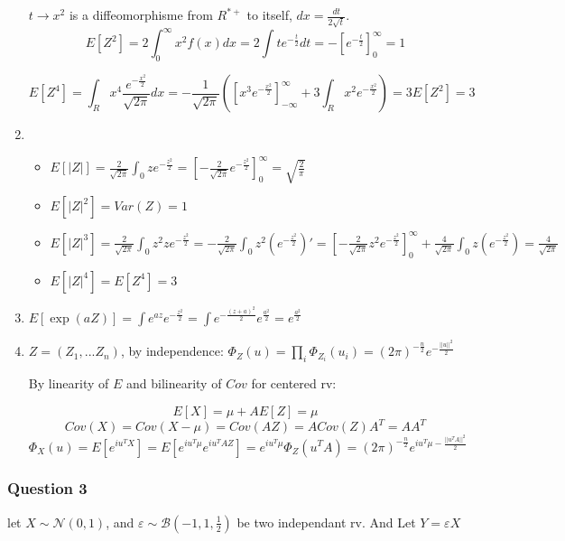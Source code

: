 \documentclass[12pt]{article}
\newcommand{\Q}[1]{\subsubsection*{Question #1}}
\begin{document}
\begin{enumerate}[label=\alph*.]
$t \rightarrow  x^2$ is a diffeomorphisme from $R^{*+}$ to itself, $dx = \frac {dt} {2\sqrt t} $.
$$E[Z^2] = 2 \int_0^{\infty} x^2 f(x) dx = 2 \int t e^{-\frac {t} 2} dt = - [e^{-\frac t 2}]_0^{\infty} = 1$$

$$E[Z^4] =  \int_R x^4 \frac{e^{-\frac{x^2}{2}}}{\sqrt{2\pi}} dx = -\frac 1 {\sqrt{2\pi}} \left([x^3 e^{-\frac{x^2}{2}}]_{-\infty}^{\infty} + 3 \int_R  x^2 e^{-\frac{x^2}{2}} \right) = 3 E[Z^2] = 3$$


\item 

\begin{itemize}

\item
$E[|Z|] = \frac{2}{\sqrt{2\pi}} \int_0 z e^{-\frac {z^2} {2}} = [-\frac{2}{\sqrt{2\pi}} e^{-\frac {z^2} {2}}]_0^{\infty} = \sqrt{\frac2 \pi}$

\item 
$E[|Z|^2] = Var(Z) = 1$

\item
$E[|Z|^3] = \frac{2}{\sqrt{2\pi}} \int_0 z^2  ze^{-\frac {z^2} {2}}
= -\frac{2}{\sqrt{2\pi}} \int_0 z^2  (e^{-\frac {z^2} {2}})' = [-\frac{2}{\sqrt{2\pi}} z^2 e^{-\frac {z^2} {2}}]_0^{\infty} + \frac{4}{\sqrt{2\pi}} \int_0 z (e^{-\frac {z^2} {2}})
= \frac{4}{\sqrt{2\pi}}$

\item
$E[|Z|^4] = E[Z^4] = 3$
\end{itemize}

\item 

$E[\exp(aZ)] = \int e^{az} e^{-\frac{z^2}{2}} = \int e^{-\frac{(z+a)^2}{2}} e^{\frac{a^2}{2}} = e^{\frac{a^2}{2}}$

\item

$Z = (Z_1, ... Z_n)$, by independence: $\Phi_Z(u) = \prod_i \Phi_{Z_i}(u_i) = (2\pi)^{-\frac n 2}e^{-\frac{||u||^2}{2}}$

By linearity of $E$ and bilinearity of $Cov$ for centered rv:


$$E[X] = \mu + AE[Z] = \mu$$
$$Cov(X) = Cov(X - \mu) = Cov(AZ) = ACov(Z)A^T =  AA^T$$
$$\Phi_X(u) = E[e^{i u^T X}] = E[e^{i u^T \mu}e^{i u^TAZ}] = e^{i u^T \mu} \Phi_Z(u^TA) =  (2\pi)^{-\frac n 2}e^{i u^T \mu -\frac{||u^TA||^2}{2}}$$
\end{enumerate}


\Q{3}


let $X \sim \mathcal N(0,1)$, and $\varepsilon \sim \mathcal B(-1, 1, \frac1 2)$ be two independant rv. And Let $Y = \varepsilon X$
\end{document}
